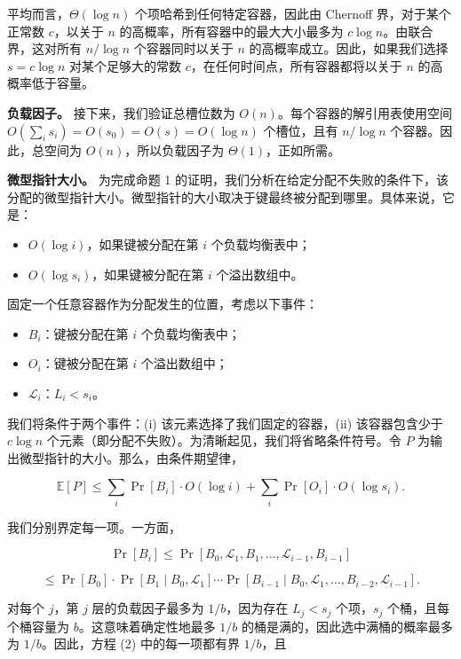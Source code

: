 \documentclass[12pt,a4paper]{ctexart}
\theoremstyle{remark}
\begin{document}
平均而言，$\Theta(\log n)$ 个项哈希到任何特定容器，因此由 Chernoff 界，对于某个正常数 $c$，以关于 $n$ 的高概率，所有容器中的最大大小最多为 $c\log n$。由联合界，这对所有 $n/\log n$ 个容器同时以关于 $n$ 的高概率成立。因此，如果我们选择 $s=c\log n$ 对某个足够大的常数 $c$，在任何时间点，所有容器都将以关于 $n$ 的高概率低于容量。

\textbf{负载因子。} 接下来，我们验证总槽位数为 $O(n)$。每个容器的解引用表使用空间 $O\left(\sum_i s_i\right)=O(s_0)=O(s)=O(\log n)$ 个槽位，且有 $n/\log n$ 个容器。因此，总空间为 $O(n)$，所以负载因子为 $\Theta(1)$，正如所需。

\textbf{微型指针大小。} 为完成命题 1 的证明，我们分析在给定分配不失败的条件下，该分配的微型指针大小。微型指针的大小取决于键最终被分配到哪里。具体来说，它是：

\begin{itemize}
\item $O(\log i)$，如果键被分配在第 $i$ 个负载均衡表中；
\item $O(\log s_i)$，如果键被分配在第 $i$ 个溢出数组中。
\end{itemize}

固定一个任意容器作为分配发生的位置，考虑以下事件：

\begin{itemize}
\item $B_i$：键被分配在第 $i$ 个负载均衡表中；
\item $O_i$：键被分配在第 $i$ 个溢出数组中；
\item $\mathcal{L}_i$：$L_i<s_i$。
\end{itemize}

我们将条件于两个事件：(i) 该元素选择了我们固定的容器，(ii) 该容器包含少于 $c\log n$ 个元素（即分配不失败）。为清晰起见，我们将省略条件符号。令 $P$ 为输出微型指针的大小。那么，由条件期望律，

$$\mathbb{E}[P]\leq\sum_i\Pr[B_i]\cdot O(\log i)+\sum_i\Pr[O_i]\cdot O(\log s_i).\tag{1}$$

我们分别界定每一项。一方面，

$$\Pr[B_i]\leq\Pr[B_0,\mathcal{L}_1,B_1,\ldots,\mathcal{L}_{i-1},B_{i-1}]$$

$$\leq\Pr[B_0]\cdot\Pr[B_1\mid B_0,\mathcal{L}_1]\cdots\Pr[B_{i-1}\mid B_0,\mathcal{L}_1,\ldots,B_{i-2},\mathcal{L}_{i-1}].\tag{2}$$

对每个 $j$，第 $j$ 层的负载因子最多为 $1/b$，因为存在 $L_j<s_j$ 个项，$s_j$ 个桶，且每个桶容量为 $b$。这意味着确定性地最多 $1/b$ 的桶是满的，因此选中满桶的概率最多为 $1/b$。因此，方程 (2) 中的每一项都有界 $1/b$，且
\end{document}
